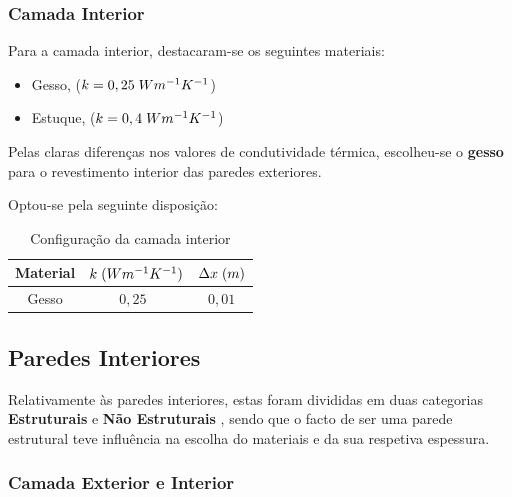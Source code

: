 \documentclass[12pt, a4paper]{article}
\begin{document}
\subsubsection{Camada Interior}\label{pext_ci}

Para a camada interior, destacaram-se os seguintes materiais:

\begin{itemize}
    \item Gesso, ($k=0,25 \hspace{1mm} Wm^{-1}K^{-1}$)
    \item Estuque, ($k=0,4 \hspace{1mm} Wm^{-1}K^{-1}$)
\end{itemize}

Pelas claras diferenças nos valores de condutividade térmica, escolheu-se o \textbf{gesso} para o revestimento interior
das paredes exteriores.

\pagebreak
Optou-se pela seguinte disposição:

\begin{table}[htpb]
    \begin{center}
        \begin{tabular}{||c c c||}
            \hline
            Material & $k \hspace{1mm} (Wm^{-1}K^{-1})$ & $\Delta x \hspace{1mm} (m)$ \\ [0.5ex]
            \hline\hline
            Gesso    & $0,25$~\cite{gesso_k}                          & $0,01$                      \\
            \hline
        \end{tabular}
    \end{center}
    \caption{Configura\c{c}\~ao da camada interior}
\end{table}

\subsection{Paredes Interiores}\label{sub:paredes_int}

Relativamente \`as paredes interiores, estas foram divididas em duas categorias {\textemdash}
\textbf{Estruturais} e \textbf{N\~ao Estruturais} {\textemdash}, sendo que o facto de ser
uma parede estrutural teve influ\^encia na escolha do materiais e da sua respetiva espessura.

\subsubsection{Camada Exterior e Interior}\label{ssub:paredes_int_ext}
\end{document}
